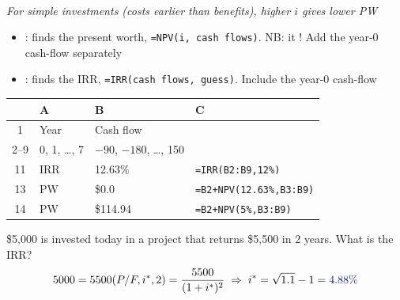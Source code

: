 \begin{center}
    \\[2pt] \textit{\small For simple investments (costs earlier than benefits), higher $i$ gives lower PW}
\end{center}

\begin{itemize}
    \item {}: finds the present worth, \texttt{=NPV(i, cash flows)}. NB: it ! Add the year-0 cash-flow separately
    \item {}: finds the IRR, \texttt{=IRR(cash flows, guess)}. Include the year-0 cash-flow
\end{itemize}
\begin{center}
\begin{tabular}{clll}
    \toprule
    & A & B & C \\
    \midrule
    1 & Year & Cash flow & \\
    2--9 & 0, 1, \dots, 7 & $-90$, $-180$, \dots, 150 & \\
    11 & IRR & 12.63\% & \texttt{=IRR(B2:B9,12\%)} \\
    13 & PW & \$0.0 & \texttt{=B2+NPV(12.63\%,B3:B9)} \\
    14 & PW & \$114.94 & \texttt{=B2+NPV(5\%,B3:B9)} \\
    \bottomrule
\end{tabular}
\end{center}

\begin{example}
    \$5,000 is invested today in a project that returns \$5,500 in 2 years.
    What is the IRR?
    \\
    \[5000 = 5500(P/F,i^*,2) = \frac{5500}{(1+i^*)^2} \;\Rightarrow\; i^* = \sqrt{1.1} - 1 = \db{4.88\%}\]
\end{example}

